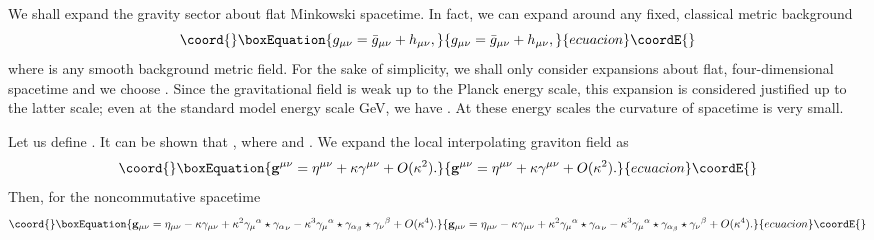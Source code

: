 \documentclass[a4paper,10pt]{article}
\begin{document}
We shall expand the gravity sector about flat Minkowski spacetime. In fact, we can
expand around any fixed, classical metric background~\cite{Veltman}
\begin{equation}\coord{}\boxEquation{
\label{background}
g_{\mu\nu}={\bar g}_{\mu\nu}+h_{\mu\nu},
}{
g_{\mu\nu}={\bar g}_{\mu\nu}+h_{\mu\nu},
}{ecuacion}\coordE{}\end{equation}
where \coordHE{} is any smooth background metric field. For the sake of
simplicity, we shall only consider expansions about flat,
four-dimensional spacetime and we choose \coordHE{}. Since the
gravitational field is weak up to the Planck energy scale, this expansion
is considered justified up to the latter scale; even at the standard model
energy scale \coordHE{} GeV, we have \coordHE{}. At these energy scales the curvature of spacetime is very small.

Let us define \coordHE{}.
It can be shown that \coordHE{}, where \coordHE{} and \coordHE{}.
We expand the local interpolating graviton field \coordHE{} as
\begin{equation}\coord{}\boxEquation{
{\bf g}^{\mu\nu}=\eta^{\mu\nu}+\kappa\gamma^{\mu\nu}+O(\kappa^2).
}{
{\bf g}^{\mu\nu}=\eta^{\mu\nu}+\kappa\gamma^{\mu\nu}+O(\kappa^2).
}{ecuacion}\coordE{}\end{equation}
Then, for the noncommutative spacetime
\begin{equation}\coord{}\boxEquation{
{\bf g}_{\mu\nu}=\eta_{\mu\nu}-\kappa\gamma_{\mu\nu}
+\kappa^2{\gamma_\mu}^\alpha\star{\gamma_\alpha}_\nu-\kappa^3{\gamma_\mu}^\alpha
\star\gamma_{\alpha_\beta}\star{\gamma_\nu}^\beta+O(\kappa^4).
}{
{\bf g}_{\mu\nu}=\eta_{\mu\nu}-\kappa\gamma_{\mu\nu}
+\kappa^2{\gamma_\mu}^\alpha\star{\gamma_\alpha}_\nu-\kappa^3{\gamma_\mu}^\alpha
\star\gamma_{\alpha_\beta}\star{\gamma_\nu}^\beta+O(\kappa^4).
}{ecuacion}\coordE{}\end{equation}
\end{document}
